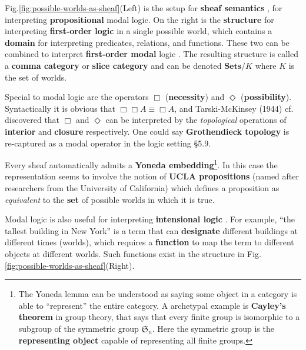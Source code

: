 \documentclass[runningheads]{llncs}
\begin{document}
Fig.\ref{fig:possible-worlds-as-sheaf}(Left) is the setup for \textbf{sheaf semantics} \cite{Goldblatt1984} \cite{Bell1988}, for interpreting \textbf{propositional} modal logic.   On the right is the \textbf{structure} for interpreting \textbf{first-order logic} in a single possible world, which contains a \textbf{domain} for interpreting predicates, relations, and functions.  These two can be combined to interpret \textbf{first-order modal} logic \cite{Awodey2007} \cite{Awodey2014}. The resulting structure is called a \textbf{comma category} \cite{MacLane1997} or \textbf{slice category} and can be denoted $\mathbf{Sets}/K$ where $K$ is the set of worlds.

Special to modal logic are the operators $\Box$ (\textbf{necessity}) and $\Diamond$ (\textbf{possibility}).  Syntactically it is obvious that $\Box \Box A \equiv \Box A$, and Tarski-McKinsey (1944) cf. \cite{Dunn2001} discovered that $\Box$ and $\Diamond$ can be interpreted by the \textit{topological} operations of \textbf{interior} and \textbf{closure} respectively.  %
One could say \textbf{Grothendieck topology} is re-captured as a modal operator in the logic setting \cite{Rodin2014} \S5.9.

Every sheaf automatically admits a \textbf{Yoneda embedding}\footnote{The Yoneda lemma can be understood as saying some object in a category is able to ``represent'' the entire category.  A archetypal example is \textbf{Cayley's theorem} in group theory, that says that every finite group is isomorphic to a subgroup of the symmetric group $\mathfrak{S}_n$. Here the symmetric group is the \textbf{representing object} capable of representing all finite groups.}.  In this case the representation seems to involve the notion of \textbf{UCLA propositions} \cite{Dunn2001} (named after researchers from the University of California) which defines a proposition as \textit{equivalent} to the \textbf{set} of possible worlds in which it is true.

Modal logic is also useful for interpreting \textbf{intensional logic} \cite{Stanford2022-intension}.  For example, ``the tallest building in New York'' is a term that can \textbf{designate} different buildings at different times (worlds), which requires a \textbf{function} to map the term to different objects at different worlds.  Such functions exist in the structure in Fig.\ref{fig:possible-worlds-as-sheaf}(Right).
\end{document}
